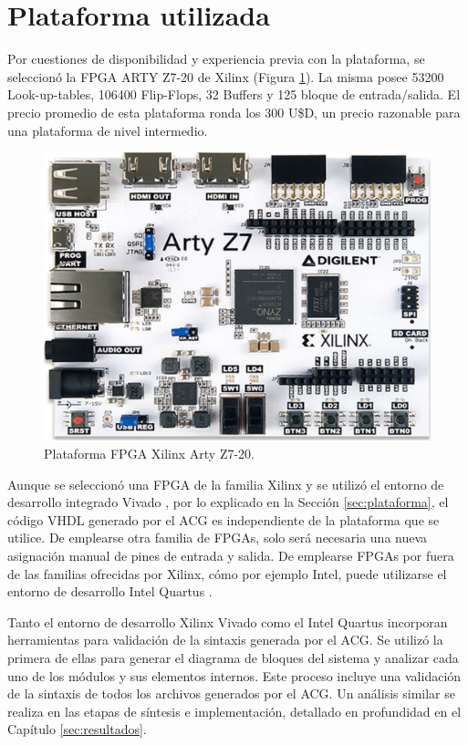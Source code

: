 \section{Plataforma utilizada}
	\label{sec:AGG}
	
	Por cuestiones de disponibilidad y experiencia previa con la plataforma, se seleccionó la FPGA ARTY Z7-20 de Xilinx (Figura \ref{fig:FPGA}). La misma posee 53200 Look-up-tables, 106400 Flip-Flops, 32 Buffers y 125 bloque de entrada/salida. El precio promedio de esta plataforma ronda los 300 U\$D, un precio razonable para una plataforma de nivel intermedio.	
	
	\begin{figure}[H]
		\centering
		\includegraphics[width=1\textwidth]{Figuras/FPGA}
		\centering\caption{Plataforma FPGA Xilinx Arty Z7-20.}
		\label{fig:FPGA}
	\end{figure}
	
	Aunque se seleccionó una FPGA de la familia Xilinx \cite{Paper_30,Paper_36,Paper_37,Paper_40,Paper_41,Paper_47,Paper_97,Paper_104,Paper_106} y se utilizó el entorno de desarrollo integrado Vivado \cite{VIVADO,Paper_111}, por lo explicado en la Sección \ref{sec:plataforma}, el código VHDL generado por el ACG es independiente de la plataforma que se utilice. De emplearse otra familia de FPGAs, solo será necesaria una nueva asignación manual de pines de entrada y salida. De emplearse FPGAs por fuera de las familias ofrecidas por Xilinx, cómo por ejemplo Intel, puede utilizarse el entorno de desarrollo Intel Quartus \cite{QUARTUS}.
	
	Tanto el entorno de desarrollo Xilinx Vivado como el Intel Quartus incorporan herramientas para validación de la sintaxis generada por el ACG. Se utilizó la primera de ellas para generar el diagrama de bloques del sistema y analizar cada uno de los módulos y sus elementos internos. Este proceso incluye una validación de la sintaxis de todos los archivos generados por el ACG. Un análisis similar se realiza en las etapas de síntesis e implementación, detallado en profundidad en el Capítulo \ref{sec:resultados}.
	
